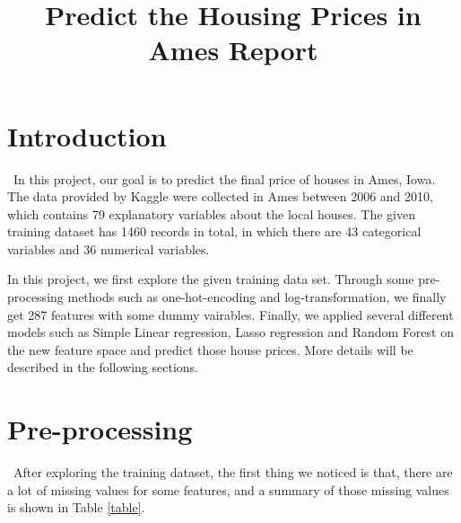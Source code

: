 \documentclass[12pt]{article}
\title{Predict the Housing Prices in Ames Report}
\begin{document}
%
\maketitle

\section{Introduction}
\quad\ In this project, our goal is to predict the final price of houses in Ames, Iowa. The data provided by Kaggle were collected in Ames between 2006 and 2010, which contains 79 explanatory variables about the local houses. The given training dataset has 1460 records in total, in which there are 43 categorical variables and 36 numerical variables. 

In this project, we first explore the given training data set. Through some pre-processing methods such as one-hot-encoding and log-transformation, we finally get 287 features with some dummy vairables. Finally, we applied several different models such as Simple Linear regression, Lasso regression and Random Forest on the new feature space and predict those house prices. More details will be described in the following sections.

\section{Pre-processing}
\quad\ After exploring the training dataset, the first thing we noticed is that, there are a lot of missing values for some features, and a summary of those missing values is shown in Table \ref{table}.
\end{document}
